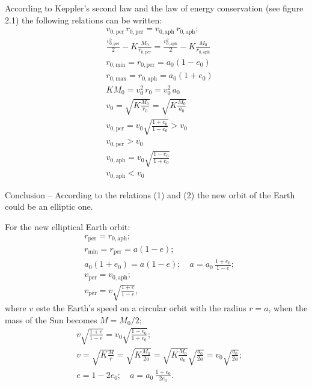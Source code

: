 \begin{description}
  According to Keppler's %
  second law and the law of energy conservation (see figure 2.1) the
  following relations can be written:
  \begin{align*}
    & v_{0,\mathrm{per}}\, r_{0,\mathrm{per}}
      = v_{0,\mathrm{aph}}\, r_{0,\mathrm{aph}}; \\
    & \frac{v_{0,\mathrm{per}}^2}{2} - K\frac{M_0}{r_{0,\mathrm{per}}}
      = \frac{v_{0,\mathrm{aph}}^2}{2} - K\frac{M_0}{r_{0,\mathrm{aph}}} \\
    & r_{0,\mathrm{min}} = r_{0,\mathrm{per}} = a_0(1 - e_0) \\
    & r_{0,\mathrm{max}} = r_{0,\mathrm{aph}} = a_0(1 + e_0) \\
    & KM_0 = v_0^2\, r_0 = v_0^2\, a_0 \\
    & v_0 = \sqrt{K\frac{M_0}{r_0}} = \sqrt{K\frac{M_0}{a_0}} \\
    & v_{0,\mathrm{per}} = v_0 \sqrt{\frac{1 + e_0}{1 - e_0}} > v_0 \\
    & v_{0,\mathrm{per}} > v_0 \tag*{(1)} \\
    & v_{0,\mathrm{aph}} = v_0 \sqrt{\frac{1 - e_0}{1 + e_0}} \\
    & v_{0,\mathrm{aph}} < v_0 \tag*{(2)}
  \end{align*}

  Conclusion -- According to the relations (1) and (2) the new orbit of the
  Earth could be an elliptic one.

  For the new elliptical Earth orbit:
  \begin{align*}
    & r_{\mathrm{per}} = r_{0,\mathrm{aph}}; \\
    & r_{\mathrm{min}} = r_{\mathrm{per}} = a(1 - e); \\
    & a_0(1 + e_0) = a(1 - e); \quad a = a_0\,\frac{1 + e_0}{1 - e}; \\
    & v_{\mathrm{per}} = v_{0,\mathrm{aph}}; \\
    & v_{\mathrm{per}} = v\sqrt{\frac{1 + e}{1 - e}},
  \end{align*}
  where $v$ este %
  the Earth's speed on a circular orbit with the radius $r = a$, when the
  mass of the Sun becomes $M = M_0/2$;
  \begin{align*}
    & v\sqrt{\frac{1 + e}{1 - e}} = v_0\sqrt{\frac{1 - e_0}{1 + e_0}}; \\
    & v = \sqrt{K\frac{M}{r}} = \sqrt{K\frac{M_0}{2a}}
      = \sqrt{K\frac{M_0}{a_0}}\sqrt{\frac{a_0}{2a}}
      = v_0\sqrt{\frac{a_0}{2a}}; \\
    & e = 1 - 2e_0; \quad a = a_0\,\frac{1 + e_0}{2e_0}.
  \end{align*}


\end{description}
